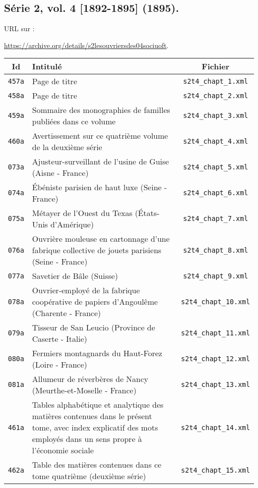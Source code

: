 \subsection{Série 2, vol. 4 [1892-1895] (1895).}
\label{mappings2t4}

URL sur \ia{} : 

\url{https://archive.org/details/s2lesouvriersdes04sociuoft}.

\begin{center}
\begin{longtable}{ | c | p{9.5cm} | c | }
\hline
Id & Intitulé & Fichier \\ \hline
\texttt{457a} & Page de titre & \texttt{s2t4\_chapt\_1.xml} \\ \hline
\texttt{458a} & Page de titre & \texttt{s2t4\_chapt\_2.xml} \\ \hline
\texttt{459a} & Sommaire des monographies de familles publiées dans ce volume & \texttt{s2t4\_chapt\_3.xml} \\ \hline
\texttt{460a} & Avertissement sur ce quatrième volume de la deuxième série & \texttt{s2t4\_chapt\_4.xml} \\ \hline
\texttt{073a} & Ajusteur-surveillant de l'usine de Guise (Aisne - France) & \texttt{s2t4\_chapt\_5.xml} \\ \hline
\texttt{074a} & Ébéniste parisien de haut luxe (Seine - France) & \texttt{s2t4\_chapt\_6.xml} \\ \hline
\texttt{075a} & Métayer de l'Ouest du Texas (États-Unis d'Amérique) & \texttt{s2t4\_chapt\_7.xml} \\ \hline
\texttt{076a} & Ouvrière mouleuse en cartonnage d'une fabrique collective de jouets parisiens (Seine - France) & \texttt{s2t4\_chapt\_8.xml} \\ \hline
\texttt{077a} & Savetier de Bâle (Suisse) & \texttt{s2t4\_chapt\_9.xml} \\ \hline
\texttt{078a} & Ouvrier-employé de la fabrique coopérative de papiers d'Angoulême (Charente - France) & \texttt{s2t4\_chapt\_10.xml} \\ \hline
\texttt{079a} & Tisseur de San Leucio (Province de Caserte - Italie) & \texttt{s2t4\_chapt\_11.xml} \\ \hline
\texttt{080a} & Fermiers montagnards du Haut-Forez (Loire - France) & \texttt{s2t4\_chapt\_12.xml} \\ \hline
\texttt{081a} & Allumeur de réverbères de Nancy (Meurthe-et-Moselle - France) & \texttt{s2t4\_chapt\_13.xml} \\ \hline
\texttt{461a} & Tables alphabétique et analytique des matières contenues dans le présent tome, avec index explicatif des mots employés dans un sens propre à l'économie sociale & \texttt{s2t4\_chapt\_14.xml} \\ \hline
\texttt{462a} & Table des matières contenues dans ce tome quatrième (deuxième série) & \texttt{s2t4\_chapt\_15.xml} \\ \hline
\end{longtable}
\end{center}

